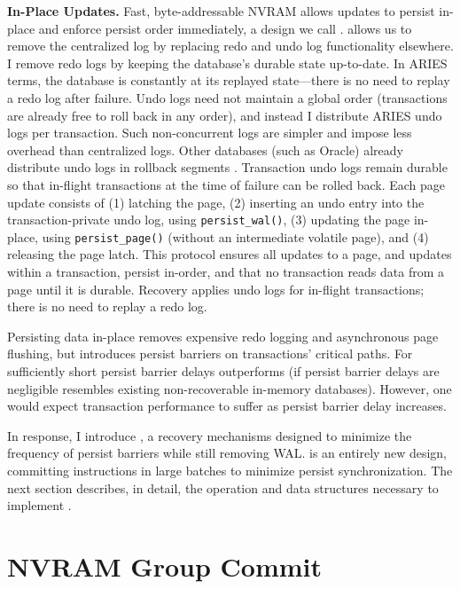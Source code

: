 \textbf{In-Place Updates.}
Fast, byte-addressable NVRAM allows updates to persist in-place and enforce persist order immediately, a design we call \InPlace.
\InPlace allows us to remove the centralized log by replacing redo and undo log functionality elsewhere.
I remove redo logs by keeping the database's durable state up-to-date.
In ARIES terms, the database is constantly at its replayed state---there is no need to replay a redo log after failure.
Undo logs need not maintain a global order (transactions are already free to roll back in any order), and instead I distribute ARIES undo logs per transaction.
Such non-concurrent logs are simpler and impose less overhead than centralized logs.
Other databases (such as Oracle) already distribute undo logs in rollback segments .
Transaction undo logs remain durable so that in-flight transactions at the time of failure can be rolled back.
Each page update consists of (1) latching the page, (2) inserting an undo entry into the transaction-private undo log, using \texttt{persist\_wal()}, (3) updating the page in-place, using \texttt{persist\_page()} (without an intermediate volatile page), and (4) releasing the page latch.
This protocol ensures all updates to a page, and updates within a transaction, persist in-order, and that no transaction reads data from a page until it is durable.
Recovery applies undo logs for in-flight transactions; there is no need to replay a redo log.

Persisting data in-place removes expensive redo logging and asynchronous page flushing, but introduces persist barriers on transactions' critical paths.
For sufficiently short persist barrier delays \InPlace outperforms \NVDisk (if persist barrier delays are negligible \InPlace resembles existing non-recoverable in-memory databases).
However, one would expect transaction performance to suffer as persist barrier delay increases.

In response, I introduce \GroupCommit, a recovery mechanisms designed to minimize the frequency of persist barriers while still removing WAL.
\GroupCommit is an entirely new design, committing instructions in large batches to minimize persist synchronization.
The next section describes, in detail, the operation and data structures necessary to implement \GroupCommit.

\section{NVRAM Group Commit}
\label{sec:OLTP_design:GroupCommit}

